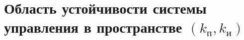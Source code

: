 \section{Область устойчивости системы управления в пространстве $(k_{\text{п}}, k_{\text{и}})$}




